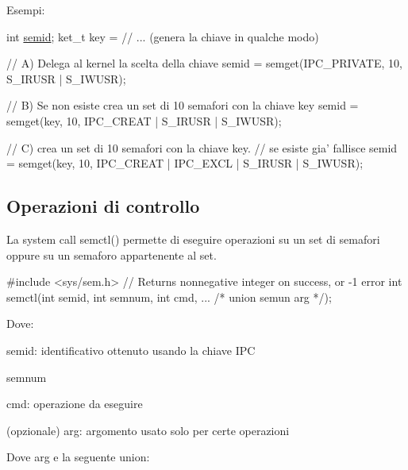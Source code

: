 Esempi\+: 
\begin{DoxyCode}
\textcolor{keywordtype}{int} \hyperlink{client_8c_a7c35ac5305085cf7360645b8d52988b5}{semid};
ket\_t key = \textcolor{comment}{// ... (genera la chiave in qualche modo)}

\textcolor{comment}{// A) Delega al kernel la scelta della chiave}
semid = semget(IPC\_PRIVATE, 10, S\_IRUSR | S\_IWUSR);

\textcolor{comment}{// B) Se non esiste crea un set di 10 semafori con la chiave key}
semid = semget(key, 10, IPC\_CREAT | S\_IRUSR | S\_IWUSR);

\textcolor{comment}{// C) crea un set di 10 semafori con la chiave key.}
\textcolor{comment}{//    se esiste gia' fallisce}
semid = semget(key, 10, IPC\_CREAT | IPC\_EXCL | S\_IRUSR | S\_IWUSR);
\end{DoxyCode}


\subsection*{Operazioni di controllo}

La system call {\ttfamily semctl()} permette di eseguire operazioni su un set di semafori oppure su un semaforo appartenente al set.


\begin{DoxyCode}
\textcolor{preprocessor}{#include <sys/sem.h>}
\textcolor{comment}{// Returns nonnegative integer on success, or -1 error}
\textcolor{keywordtype}{int} semctl(\textcolor{keywordtype}{int} semid, \textcolor{keywordtype}{int} semnum, \textcolor{keywordtype}{int} cmd, ... \textcolor{comment}{/* union semun arg */});
\end{DoxyCode}


Dove\+:
\begin{DoxyItemize}
\item {\ttfamily semid}\+: identificativo ottenuto usando la chiave I\+PC
\item {\ttfamily semnum}
\item {\ttfamily cmd}\+: operazione da eseguire
\item (opzionale) {\ttfamily arg}\+: argomento usato solo per certe operazioni
\end{DoxyItemize}

Dove {\ttfamily arg} e\textquotesingle{} la seguente union\+:


